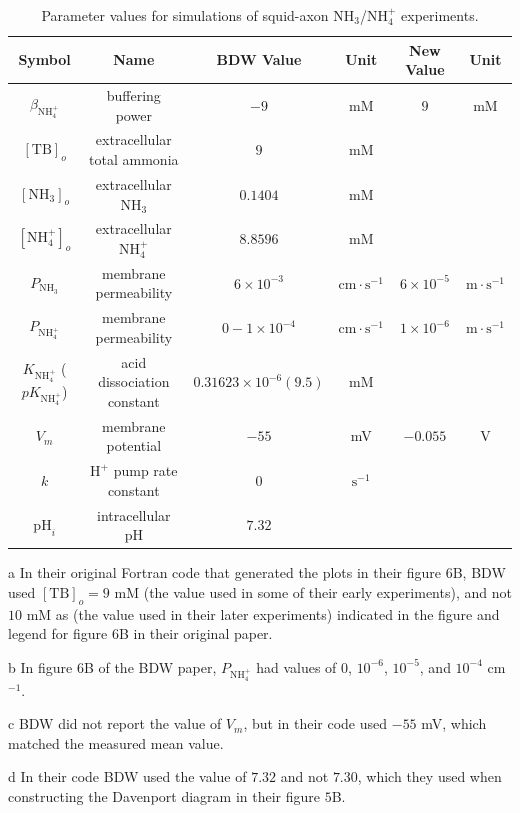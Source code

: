 \documentclass[fleqn,10pt]{physiome}
\begin{document}
\begin{table}\centering
\caption{Parameter values for simulations of squid-axon $\mathrm{NH_3}$/$\mathrm{NH_4^+}$ experiments.}
\begin{threeparttable}
\begin{tabular}{|c|c|c|c|c|c|}
\hline 
  \textbf{Symbol} & \textbf{Name} & \textbf{BDW Value} & \textbf{Unit} & \textbf{New Value} & \textbf{Unit} \\ 
\hline 
$\beta_\mathrm{NH_4^+}$ & buffering power & $-9$ & mM & $9$ & mM \\ 
\hline 
${\mathrm{[TB]}_o}$ & extracellular total ammonia & $9$ \tnote{a} & mM & & \\ 
\hline
${\mathrm{[NH_3]}_o}$ & extracellular $\mathrm{NH_3}$ & $0.1404$ & mM & & \\ 
\hline
${\mathrm{[NH_4^+]}_o}$ & extracellular $\mathrm{NH_4^+}$ & $8.8596$ & mM & & \\ 
\hline
$P_{\mathrm{NH_3}}$ & membrane permeability & $6\times 10^{-3}$ & $\mathrm{cm\cdot s^{-1}}$ & $6\times 10^{-5}$ & $\mathrm{m\cdot s^{-1}}$ \\ 
\hline 
$P_{\mathrm{NH_4^+}}$ & membrane permeability & $0-1\times 10^{-4}$ \tnote{b} & $\mathrm{cm\cdot s^{-1}}$ & $1\times 10^{-6}$ & $\mathrm{m\cdot s^{-1}}$ \\
\hline 
$K_\mathrm{NH_4^+}$ ($pK_\mathrm{NH_4^+}$) & acid dissociation constant & $0.31623\times10^{-6}(9.5)$ & mM & & \\
\hline 
$V_m$ & membrane potential & $-55$ \tnote{c} & mV & $-0.055$ & V \\ \hline 
$k$ & $\mathrm{H^+}$ pump rate constant & $0$ & $\mathrm{s^{-1}}$ & & \\
\hline 
$\mathrm{pH}_i$ & intracellular $\mathrm{pH}$ & $7.32$ \tnote{d} & & & \\
\hline
\end{tabular}
\begin{tablenotes}
    \item[a] In their original Fortran code that generated the plots in their figure $6$B, BDW used $\mathrm{[TB]}_o=9$ mM (the value used in some of their early experiments), and not $10$ mM as (the value used in their later experiments) indicated in the figure and legend for figure $6$B in their original paper.
    \item[b] In figure $6$B of the BDW paper, $P_\mathrm{NH_4^+}$ had values of $0$, $10^{-6}$, $10^{-5}$, and $10^{-4}$ cm$^{-1}$.
    \item[c] BDW did not report the value of $V_m$, but in their code used $-55$ mV, which matched the measured mean value.
    \item[d] In their code BDW used the value of $7.32$ and not $7.30$, which they used when constructing the Davenport diagram in their figure $5$B.
\end{tablenotes}
\end{threeparttable}
\label{table3}
\end{table}
\end{document}
